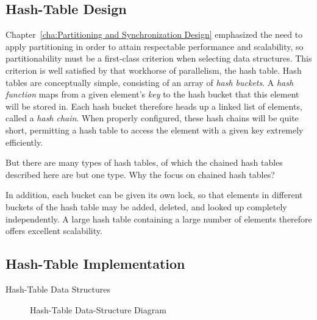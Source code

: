 \subsection{Hash-Table Design}
\label{sec:datastruct:Hash-Table Design}

Chapter~\ref{cha:Partitioning and Synchronization Design}
emphasized the need to apply partitioning in order to attain
respectable performance and scalability, so partitionability
must be a first-class criterion when selecting data structures.
This criterion is well satisfied by that workhorse of parallelism,
the hash table.
Hash tables are conceptually simple, consisting of an array of
\emph{hash buckets}.
A \emph{hash function} maps from a given element's \emph{key}
to the hash bucket that this element will be stored in.
Each hash bucket therefore heads up a linked list of elements,
called a \emph{hash chain}.
When properly configured, these hash chains will be quite short,
permitting a hash table to access the element with a given key
extremely efficiently.

\QuickQuiz{}
	But there are many types of hash tables, of which the chained
	hash tables described here are but one type.
	Why the focus on chained hash tables?
 \QuickQuizEnd

In addition, each bucket can be given its own lock, so that
elements in different buckets of the hash table may be added,
deleted, and looked up completely independently.
A large hash table containing a large number of elements therefore
offers excellent scalability.

\subsection{Hash-Table Implementation}
\label{sec:datastruct:Hash-Table Implementation}

\begin{listing}[tb]

\caption{Hash-Table Data Structures}
\label{lst:datastruct:Hash-Table Data Structures}
\end{listing}

\begin{figure}[tb]
\centering
{}
\caption{Hash-Table Data-Structure Diagram}
\label{fig:datastruct:Hash-Table Data-Structure Diagram}
\end{figure}

